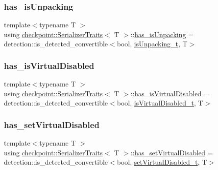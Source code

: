 \subsubsection{\texorpdfstring{has\+\_\+is\+Unpacking}{has\_isUnpacking}}
{\footnotesize\ttfamily template$<$typename T $>$ \\
using \hyperlink{structcheckpoint_1_1_serializer_traits}{checkpoint\+::\+Serializer\+Traits}$<$ T $>$\+::\hyperlink{structcheckpoint_1_1_serializer_traits_ab3d539e82b415b4a98ac7fc13aaab685}{has\+\_\+is\+Unpacking} =  detection\+::is\+\_\+detected\+\_\+convertible$<$bool, \hyperlink{structcheckpoint_1_1_serializer_traits_abc375c9fd74b102d51a74af8884c72e0}{is\+Unpacking\+\_\+t}, T$>$}

\mbox{\label{structcheckpoint_1_1_serializer_traits_ac590c05fc0b7df1473c2bec826227c78}} 
\subsubsection{\texorpdfstring{has\+\_\+is\+Virtual\+Disabled}{has\_isVirtualDisabled}}
{\footnotesize\ttfamily template$<$typename T $>$ \\
using \hyperlink{structcheckpoint_1_1_serializer_traits}{checkpoint\+::\+Serializer\+Traits}$<$ T $>$\+::\hyperlink{structcheckpoint_1_1_serializer_traits_ac590c05fc0b7df1473c2bec826227c78}{has\+\_\+is\+Virtual\+Disabled} =  detection\+::is\+\_\+detected\+\_\+convertible$<$bool, \hyperlink{structcheckpoint_1_1_serializer_traits_ad78a62a4399d95f2085684fc09c12196}{is\+Virtual\+Disabled\+\_\+t}, T$>$}

\mbox{\label{structcheckpoint_1_1_serializer_traits_adba95a75d3573b6d8d11bf9d2300a9ca}} 
\subsubsection{\texorpdfstring{has\+\_\+set\+Virtual\+Disabled}{has\_setVirtualDisabled}}
{\footnotesize\ttfamily template$<$typename T $>$ \\
using \hyperlink{structcheckpoint_1_1_serializer_traits}{checkpoint\+::\+Serializer\+Traits}$<$ T $>$\+::\hyperlink{structcheckpoint_1_1_serializer_traits_adba95a75d3573b6d8d11bf9d2300a9ca}{has\+\_\+set\+Virtual\+Disabled} =  detection\+::is\+\_\+detected\+\_\+convertible$<$bool, \hyperlink{structcheckpoint_1_1_serializer_traits_ac8e1715e588932dc8e4dc14130b6ca9e}{set\+Virtual\+Disabled\+\_\+t}, T$>$}

